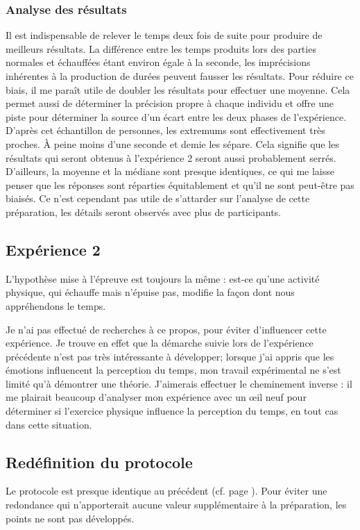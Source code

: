\documentclass[12pt,fleqn,oneside,french,openany]{book} %
\begin{document}
\subsubsection{Analyse des résultats} \label{sssec:analyseResult2.1}
Il est indispensable de relever le temps deux fois de suite pour produire de meilleurs résultats. La différence entre les temps produits lors des parties normales et échauffées étant environ égale à la seconde, les imprécisions inhérentes à la production de durées peuvent fausser les résultats. Pour réduire ce biais, il me paraît utile de doubler les résultats pour effectuer une moyenne. Cela permet aussi de déterminer la précision propre à chaque individu et offre une piste pour déterminer la source d'un écart entre les deux phases de l'expérience. D'après cet échantillon de personnes, les extremums sont effectivement très proches. À peine moins d'une seconde et demie les sépare. Cela signifie que les résultats qui seront obtenus à l'expérience 2 seront aussi probablement serrés. D'ailleurs, la moyenne et la médiane sont presque identiques, ce qui me laisse penser que les réponses sont réparties équitablement et qu'il ne sont peut-être pas biaisés. Ce n'est cependant pas utile de s'attarder sur l'analyse de cette préparation, les détails seront observés avec plus de participants.


\subsection{Expérience 2} \label{ssec:but2.2}
L'hypothèse mise à l'épreuve est toujours la même : est-ce qu'une activité physique, qui échauffe mais n'épuise pas, modifie la façon dont nous appréhendons le temps. 

Je n'ai pas effectué de recherches à ce propos, pour éviter d'influencer cette expérience. Je trouve en effet que la démarche suivie lors de l'expérience précédente n'est pas très intéressante à développer; lorsque j'ai appris que les émotions influencent la perception du temps, mon travail expérimental ne s'est limité qu'à démontrer une théorie. J'aimerais effectuer le cheminement inverse : il me plairait beaucoup d'analyser mon expérience avec un \oe il neuf pour déterminer si l'exercice physique influence la perception du temps, en tout cas dans cette situation.

\subsection{Redéfinition du protocole} \label{ssec:defProto2.2}
\begin{remark}
	Le protocole est presque identique au précédent (cf. page \pageref{sssec:preparation2.1}). Pour éviter une redondance qui n'apporterait aucune valeur supplémentaire à la préparation, les points ne sont pas développés.
\end{remark}
\end{document}
